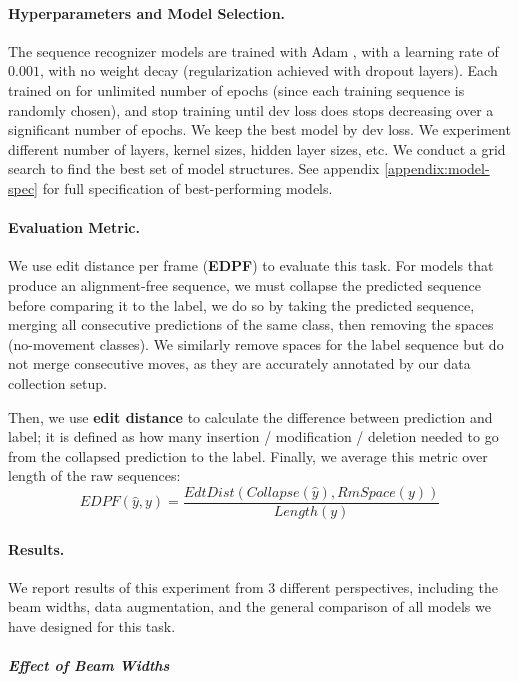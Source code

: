 \documentclass[10pt,twocolumn,letterpaper]{article}
\begin{document}
\paragraph{Hyperparameters and Model Selection.}
The sequence recognizer models are trained with Adam \cite{kingma2014adam}, with a learning rate of $0.001$, with no weight decay (regularization achieved with dropout layers). Each trained on for unlimited number of epochs (since each training sequence is randomly chosen), and stop training until dev loss does stops decreasing over a significant number of epochs. We keep the best model by dev loss. We experiment different number of layers, kernel sizes, hidden layer sizes, etc. We conduct a grid search to find the best set of model structures. See appendix \ref{appendix:model-spec} for full specification of best-performing models. 

\paragraph{Evaluation Metric.}

We use edit distance per frame (\textbf{EDPF}) to evaluate this task. For models that produce an alignment-free sequence, we must collapse the predicted sequence before comparing it to the label, we do so by taking the predicted sequence, merging all consecutive predictions of the same class, then removing the spaces (no-movement classes). We similarly remove spaces for the label sequence but do not merge consecutive moves, as they are accurately annotated by our data collection setup.

Then, we use \textbf{edit distance} to calculate the difference between prediction and label; it is defined as how many insertion / modification / deletion needed to go from the collapsed prediction to the label. Finally, we average this metric over length of the raw sequences: 
\[
    EDPF(\hat y, y) = \frac{EdtDist(Collapse(\hat y), RmSpace(y))  }
    {Length(y)}
\]

\paragraph{Results.} 
We report results of this experiment from 3 different perspectives, including the beam widths, data augmentation, and the general comparison of all models we have designed for this task.

\vspace{-3mm}
\subparagraph{Effect of Beam Widths}
\end{document}
